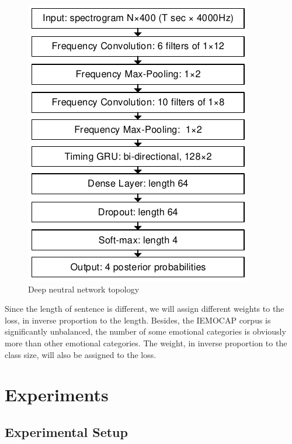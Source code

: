 \documentclass[a4paper]{article}
\begin{document}
\begin{figure}[!htb]
\centering
\centerline{\includegraphics{network}}
\caption{Deep neutral network topology}
\label{fig:network}
\end{figure}

Since the length of sentence is different, we will assign different weights to the loss, in inverse proportion to the length. Besides, the IEMOCAP corpus is significantly unbalanced, the number of some emotional categories is obviously more than other emotional categories. The weight, in inverse proportion to the class size, will also be assigned to the loss.


\section{Experiments}
\label{sec:experiments}

\subsection{Experimental Setup}
\label{ssec:experimental setup}
\end{document}
